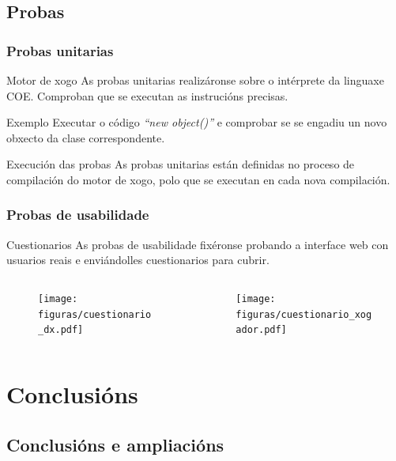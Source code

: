 \documentclass[12pt]{beamer}
\begin{document}
\subsection{Probas}
\begin{frame}
\frametitle{Probas unitarias}
\begin{block}{Motor de xogo}
As probas unitarias realizáronse \alert{sobre o intérprete da linguaxe COE}.
Comproban que se executan as instrucións precisas.
\end{block}
\begin{exampleblock}{Exemplo}
Executar o código \textit{``new object()''} e comprobar se se engadiu un novo
obxecto da clase correspondente.
\end{exampleblock}
\begin{alertblock}{Execución das probas}
As probas unitarias están definidas no proceso de compilación do motor de xogo,
polo que se executan en cada nova compilación.
\end{alertblock}
\end{frame}

\begin{frame}
\frametitle{Probas de usabilidade}
\begin{block}{Cuestionarios}
As probas de usabilidade fixéronse probando a interface web con usuarios reais e
enviándolles cuestionarios para cubrir.
\end{block}
\begin{columns}[T]
\begin{column}[T]{5cm}
\begin{figure}
\texttt{[image: figuras/cuestionario\_dx.pdf]} 
\end{figure}
\end{column}
\begin{column}[T]{5cm}
\begin{figure}
\texttt{[image: figuras/cuestionario\_xogador.pdf]} 
\end{figure}
\end{column}
\end{columns}
\end{frame}

\section{Conclusións}
\subsection{Conclusións e ampliacións}
\end{document}
